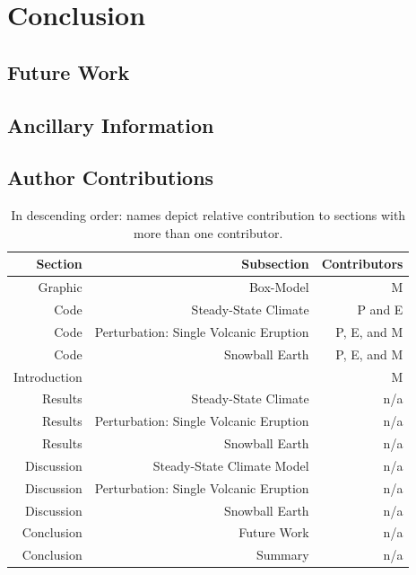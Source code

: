 \documentclass{article}
\begin{document}
\section{Conclusion}
\subsection{Future Work}

\newpage

\begin{appendices}

\section{Ancillary Information}
\subsection{Author Contributions}
\begin{table}[H]
    \centering
    \begin{tabular}{rrr}
    Section & Subsection & Contributors \\
    \hline
    Graphic & Box-Model & M  \\
    Code & Steady-State Climate & P and E \\
    Code & Perturbation: Single Volcanic Eruption & P, E, and M \\
    Code & Snowball Earth & P, E, and M \\
    Introduction &  & M \\
    Results & Steady-State Climate & n/a \\
    Results & Perturbation: Single Volcanic Eruption & n/a \\
    Results & Snowball Earth & n/a\\
    Discussion & Steady-State Climate Model & n/a \\
    Discussion & Perturbation: Single Volcanic Eruption & n/a \\
    Discussion & Snowball Earth & n/a\\
    Conclusion & Future Work & n/a \\
    Conclusion & Summary & n/a \\
    \end{tabular}
    \caption{In descending order: names depict relative contribution to sections with more than one contributor.}
    \label{tab:contributions}
\end{table}
\FloatBarrier


\end{appendices}
\end{document}
